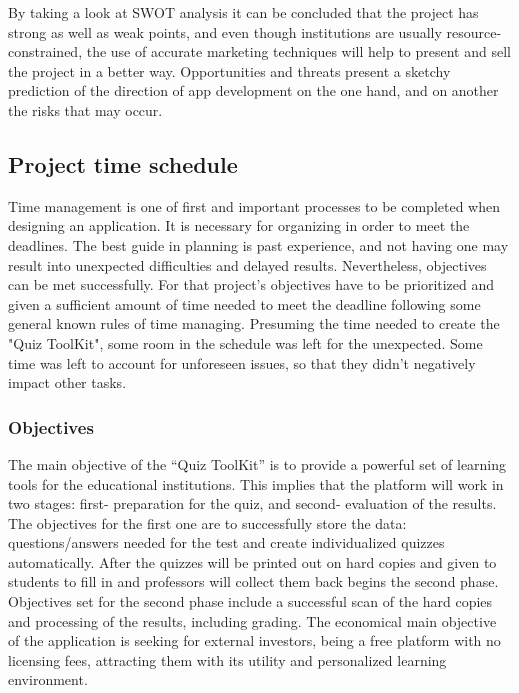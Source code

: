 By taking a look at SWOT analysis it can be concluded that the project has strong as well as weak points, and even though institutions are usually resource-constrained, the use of accurate marketing techniques will help to present and sell the project in a better way. Opportunities and threats present a sketchy prediction of the direction of app development on the one hand, and on another the risks that may occur.




\subsection{Project time schedule}
Time management is one of first and important processes to be completed when designing an application. It is necessary for organizing in order to meet the deadlines. The best guide in planning is past experience, and not having one may result into unexpected difficulties and delayed results. Nevertheless, objectives can be met successfully. For that project’s objectives have to be prioritized and given a sufficient amount of time needed to meet the deadline following some general known rules of time managing. Presuming the time needed to create the "Quiz ToolKit", some room in the schedule was left for the unexpected. Some time was left to account for unforeseen issues, so that they didn't negatively impact other tasks.
\subsubsection{Objectives}
The main objective of the “Quiz ToolKit” is to provide a powerful set of learning tools for the educational institutions. This implies that the platform will work in two stages: first- preparation for the quiz, and second- evaluation of the results. The objectives for the first one are to successfully store the data: questions/answers needed for the test and create individualized quizzes automatically. After the quizzes will be printed out on hard copies and given to students to fill in and professors will collect them back begins the second phase. Objectives set for the second phase include a successful scan of the hard copies and processing of the results, including grading. 
The economical main objective of the application is seeking for external investors, being a free platform with no licensing fees, attracting them with its utility and personalized learning environment. 

